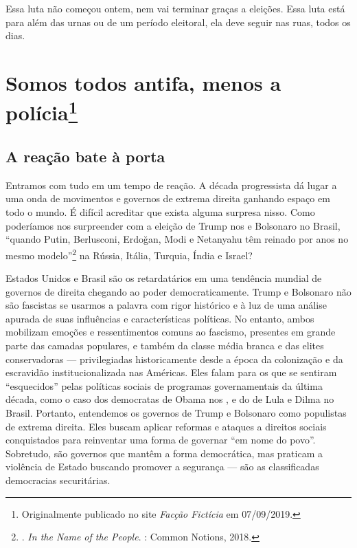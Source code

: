 Essa luta não começou ontem, nem vai terminar graças a eleições. Essa luta está para além das urnas ou de um período eleitoral, ela deve seguir nas ruas, todos os dias.

\chapter*{Somos todos antifa, menos a polícia\footnote[*]{Originalmente publicado no site \emph{Facção Fictícia} em 07/09/2019.}}




\section{A reação bate à porta}

Entramos com tudo em um tempo de reação. A década progressista dá lugar a uma onda de movimentos e governos de extrema direita ganhando espaço em todo o mundo. É difícil acreditar que exista alguma surpresa nisso. Como poderíamos nos surpreender com a eleição de Trump nos  e Bolsonaro no Brasil, ``quando Putin, Berlusconi, Erdoğan, Modi e Netanyahu têm reinado por anos no mesmo modelo''\footnote{. \emph{In the Name of the People}. : Common Notions, 2018.} na Rússia, Itália, Turquia, Índia e Israel?

Estados Unidos e Brasil são os retardatários em uma tendência mundial de governos de direita chegando ao poder democraticamente. Trump e Bolsonaro não são fascistas se usarmos a palavra com rigor histórico e à luz de uma análise apurada de suas influências e características políticas. No entanto, ambos mobilizam emoções e ressentimentos comuns ao fascismo, presentes em grande parte das camadas populares, e também da classe média branca e das elites conservadoras --- privilegiadas historicamente desde a época da colonização e da escravidão institucionalizada nas Américas. Eles falam para os que se sentiram ``esquecidos'' pelas políticas sociais de programas governamentais da última década, como o caso dos democratas de Obama nos , e do  de Lula e Dilma no Brasil. Portanto, entendemos os governos de Trump e Bolsonaro como populistas de extrema direita. Eles buscam aplicar reformas e ataques a direitos sociais conquistados para reinventar uma forma de governar ``em nome do povo''. Sobretudo, são governos que mantêm a forma democrática, mas praticam a violência de Estado buscando promover a segurança --- são as classificadas democracias securitárias.

